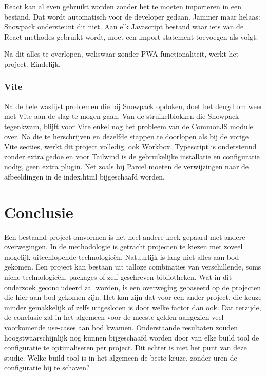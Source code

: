 React kan al even gebruikt worden zonder het te moeten importeren in een bestand. Dat wordt automatisch voor de developer gedaan. Jammer maar helaas: Snowpack ondersteunt dit niet. Aan elk Javascript bestand waar iets van de React methodes gebruikt wordt, moet een import statement toevoegen als volgt:

   

Na dit alles te overlopen, weliswaar zonder PWA-functionaliteit, werkt het project. Eindelijk.

\subsubsection{Vite}
Na de hele waslijst problemen die bij Snowpack opdoken, doet het deugd om weer met Vite aan de slag te mogen gaan. Van de struikelblokken die Snowpack tegenkwam, blijft voor Vite enkel nog het probleem van de CommonJS module over. Na die te herschrijven en dezelfde stappen te doorlopen als bij de vorige Vite secties, werkt dit project volledig, ook Workbox. Typescript is ondersteund zonder extra gedoe en voor Tailwind is de gebruikelijke installatie en configuratie nodig, geen extra plugin. Net zoals bij Parcel moeten de verwijzingen naar de afbeeldingen in de index.html bijgeschaafd worden.

\section{Conclusie}
Een bestaand project omvormen is het heel andere koek gepaard met andere overwegingen. In de methodologie is getracht projecten te kiezen met zoveel mogelijk uiteenlopende technologieën. Natuurlijk is lang niet alles aan bod gekomen. Een project kan bestaan uit talloze combinaties van verschillende, soms niche technologieën, packages of zelf geschreven bibliotheken. Wat in dit onderzoek geconcludeerd zal worden, is een overweging gebaseerd op de projecten die hier aan bod gekomen zijn. Het kan zijn dat voor een ander project, die keuze minder gemakkelijk of zelfs uitgesloten is door welke factor dan ook. Dat terzijde, de conclusie zal in het algemeen voor de meeste gelden aangezien veel voorkomende use-cases aan bod kwamen. Onderstaande resultaten zouden hoogstwaarschijnlijk nog kunnen bijgeschaafd worden door van elke build tool de configuratie te optimaliseren per project. Dit echter is niet het punt van deze studie. Welke build tool is in het algemeen de beste keuze, zonder uren de configuratie bij te schaven?

